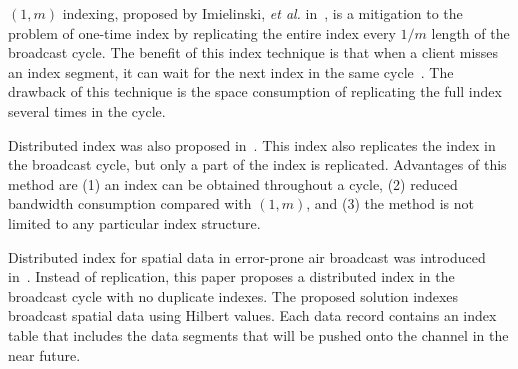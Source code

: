 $(1, m)$ indexing, proposed by Imielinski, \emph{et al.} in~\cite{journals/tkde/ImielinskiVB97}, is a mitigation to the problem of one-time index by replicating the entire index every $1/m$ length of the broadcast cycle. The benefit of this index technique is that when a client misses an index segment, it can wait for the next index in the same cycle~\cite{journals/tmc/KuZW08}. The drawback of this technique is the space consumption of replicating the full index several times in the cycle.

Distributed index was also proposed in~\cite{journals/tkde/ImielinskiVB97}. This index also replicates the index in the broadcast cycle, but only a part of the index is replicated. Advantages of this method are (1) an index can be obtained throughout a cycle, (2) reduced bandwidth consumption compared with $(1, m)$, and (3) the method is not limited to any particular index structure.



Distributed index for spatial data in error-prone air broadcast was introduced in~\cite{journals/vldb/ZhengLLLS09}. Instead of replication, this paper proposes a distributed index in the broadcast cycle with no duplicate indexes. The proposed solution indexes broadcast spatial data using Hilbert values. Each data record contains an index table that includes the data segments that will be pushed onto the channel in the near future. %


